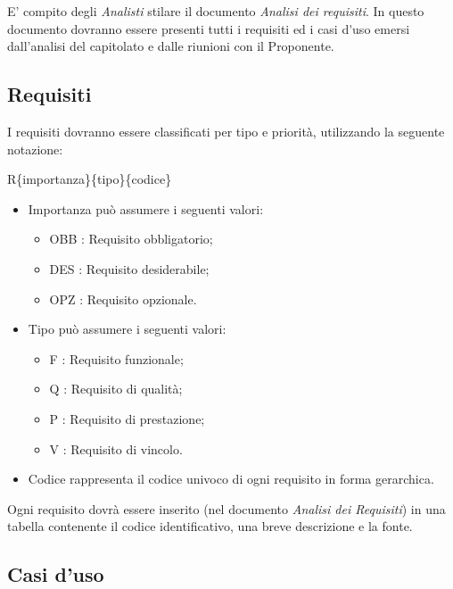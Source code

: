 E' compito degli \textit{Analisti} stilare il documento \textit{Analisi dei requisiti}.
In questo documento dovranno essere presenti tutti i requisiti ed i \gls{casi d'uso} emersi dall'analisi del capitolato e dalle riunioni con il Proponente.\\

\subsection{Requisiti}

I requisiti dovranno essere classificati per tipo e priorità, utilizzando la seguente notazione:

R\{importanza\}\{tipo\}\{codice\}
\begin{itemize}
  \item Importanza può assumere i seguenti valori:
\begin{itemize}
	\item {OBB} : Requisito obbligatorio;
	\item {DES} : Requisito desiderabile;
	\item {OPZ} : Requisito opzionale.
\end{itemize}
  \item Tipo può assumere i seguenti valori:
\begin{itemize}
	\item {F} : Requisito funzionale;
	\item {Q} : Requisito di qualità;
	\item {P} : Requisito di prestazione;
	\item {V} : Requisito di vincolo.
\end{itemize}
  \item Codice rappresenta il codice univoco di ogni requisito in forma gerarchica.
\end{itemize}
Ogni requisito dovrà essere inserito (nel documento \textit{Analisi dei Requisiti}) in una tabella contenente il codice identificativo, una breve descrizione e la fonte.

\subsection{Casi d'uso}

